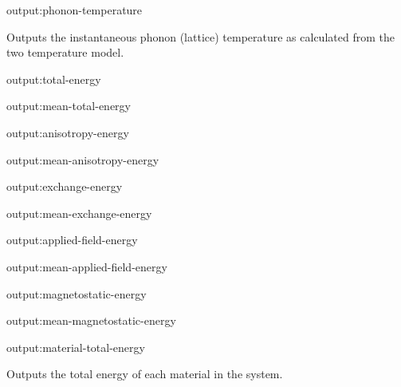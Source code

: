 {\zicf output:phonon-temperature} Outputs the instantaneous phonon (lattice) temperature as calculated from the two temperature model.




{\zicf output:total-energy}

{\zicf output:mean-total-energy}

{\zicf output:anisotropy-energy}

{\zicf output:mean-anisotropy-energy}

{\zicf output:exchange-energy}

{\zicf output:mean-exchange-energy}

{\zicf output:applied-field-energy}

{\zicf output:mean-applied-field-energy}

{\zicf output:magnetostatic-energy}

{\zicf output:mean-magnetostatic-energy}

{\zicf output:material-total-energy} Outputs the total energy of each material in the system.

